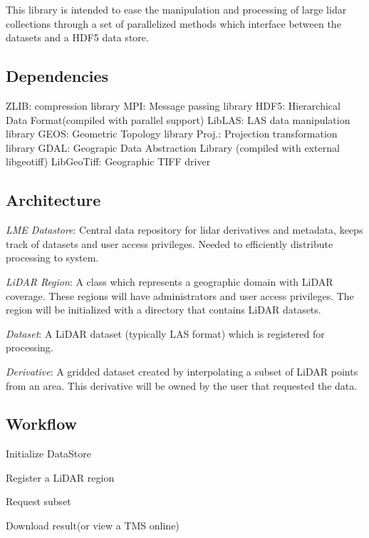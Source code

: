 This library is intended to ease the manipulation and processing of large lidar collections through a set of parallelized methods which interface between the datasets and a H\+D\+F5 data store.

\subsection*{Dependencies }

Z\+L\+I\+B\+: compression library M\+P\+I\+: Message passing library H\+D\+F5\+: Hierarchical Data Format(compiled with parallel support) Lib\+L\+A\+S\+: L\+A\+S data manipulation library G\+E\+O\+S\+: Geometric Topology library Proj.\+: Projection transformation library G\+D\+A\+L\+: Geograpic Data Abstraction Library (compiled with external libgeotiff) Lib\+Geo\+Tiff\+: Geographic T\+I\+F\+F driver

\subsection*{Architecture }

{\itshape L\+M\+E Datastore}\+: Central data repository for lidar derivatives and metadata, keeps track of datasets and user access privileges. Needed to efficiently distribute processing to system.

{\itshape Li\+D\+A\+R Region}\+: A class which represents a geographic domain with Li\+D\+A\+R coverage. These regions will have administrators and user access privileges. The region will be initialized with a directory that contains Li\+D\+A\+R datasets.

{\itshape Dataset}\+: A Li\+D\+A\+R dataset (typically L\+A\+S format) which is registered for processing.

{\itshape Derivative}\+: A gridded dataset created by interpolating a subset of Li\+D\+A\+R points from an area. This derivative will be owned by the user that requested the data.

\subsection*{Workflow }


\begin{DoxyEnumerate}
\item Initialize Data\+Store
\item Register a Li\+D\+A\+R region
\item Request subset
\item Download result(or view a T\+M\+S online) 
\end{DoxyEnumerate}
